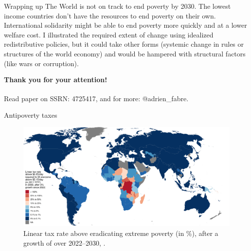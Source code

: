 \documentclass[aspectratio=169,xcolor=dvipsnames, 11pt,mathserif]{beamer}
\begin{document}
\begin{frame}{Wrapping up}
    \bbsp \ip The World is not on track to end poverty by 2030.
    \ip The lowest income countries don't have the resources to end poverty on their own. %
    \ip International solidarity might be able to end poverty more quickly and at a lower welfare cost.
    \ip I illustrated the required extent of change using idealized redistributive policies, but it could take other forms (systemic change in rules or structures of the world economy) and would be hampered with structural factors (like wars or corruption).
    \ip \quad
    \ip \begin{center} \textbf{Thank you for your attention!} \\ \quad \\  Read paper on SSRN: 4725417, and for more: @adrien\_fabre. \end{center}
    \ee
\end{frame}



\appendix

\begin{frame}{Antipoverty taxes}    
    \begin{figure}
      \caption{Linear tax rate above  eradicating extreme poverty (in \%), after a growth of  over 2022--2030, . 
      }
      \includegraphics[height=.85\textheight]{../figures/s_antipoverty_2_tax_7_average.pdf}
    \end{figure}
\end{frame}
\end{document}
